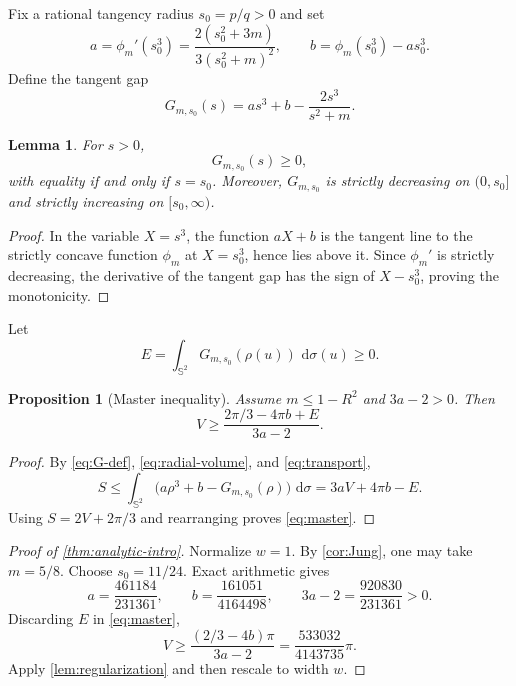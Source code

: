 \documentclass[11pt,reqno]{amsart}
\numberwithin{equation}{section}
\newtheorem{proposition}[theorem]{Proposition}
\newtheorem{lemma}[theorem]{Lemma}
\theoremstyle{definition}
\theoremstyle{remark}
\newcommand{\Sph}{\mathbb{S}^{2}}
\newcommand{\dd}{\,\mathrm{d}}
\begin{document}
Fix a rational tangency radius $s_0=p/q>0$ and set
\begin{equation}\label{eq:a-b}
 a=\phi_m'(s_0^{3})
 =\frac{2(s_0^{2}+3m)}{3(s_0^{2}+m)^{2}},
 \qquad
 b=\phi_m(s_0^{3})-as_0^{3}.
\end{equation}
Define the tangent gap
\begin{equation}\label{eq:G-def}
 G_{m,s_0}(s)=as^{3}+b-\frac{2s^{3}}{s^{2}+m}.
\end{equation}

\begin{lemma}\label{lem:gap}
For $s>0$,
\[
 G_{m,s_0}(s)\geq0,
\]
with equality if and only if $s=s_0$. Moreover, $G_{m,s_0}$ is strictly decreasing on $(0,s_0]$ and strictly increasing on $[s_0,\infty)$.
\end{lemma}

\begin{proof}
In the variable $X=s^{3}$, the function $aX+b$ is the tangent line to the strictly concave function $\phi_m$ at $X=s_0^{3}$, hence lies above it. Since $\phi_m'$ is strictly decreasing, the derivative of the tangent gap has the sign of $X-s_0^{3}$, proving the monotonicity.
\end{proof}

Let
\begin{equation}\label{eq:deficit}
 E=\int_{\Sph}G_{m,s_0}(\rho(u))\,\dd\sigma(u)\geq0.
\end{equation}

\begin{proposition}[Master inequality]\label{prop:master}
Assume $m\leq1-R^{2}$ and $3a-2>0$. Then
\begin{equation}\label{eq:master}
 V\geq\frac{2\pi/3-4\pi b+E}{3a-2}.
\end{equation}
\end{proposition}

\begin{proof}
By \eqref{eq:G-def}, \eqref{eq:radial-volume}, and \eqref{eq:transport},
\[
 S\leq\int_{\Sph}\bigl(a\rho^{3}+b-G_{m,s_0}(\rho)\bigr)\,\dd\sigma
 =3aV+4\pi b-E.
\]
Using $S=2V+2\pi/3$ and rearranging proves \eqref{eq:master}.
\end{proof}

\begin{proof}[Proof of \cref{thm:analytic-intro}]
Normalize $w=1$. By \cref{cor:Jung}, one may take $m=5/8$. Choose $s_0=11/24$. Exact arithmetic gives
\[
 a=\frac{461184}{231361},
 \qquad
 b=\frac{161051}{4164498},
 \qquad
 3a-2=\frac{920830}{231361}>0.
\]
Discarding $E$ in \eqref{eq:master},
\[
 V\geq\frac{(2/3-4b)\pi}{3a-2}
 =\frac{533032}{4143735}\pi.
\]
Apply \cref{lem:regularization} and then rescale to width $w$.
\end{proof}
\end{document}
